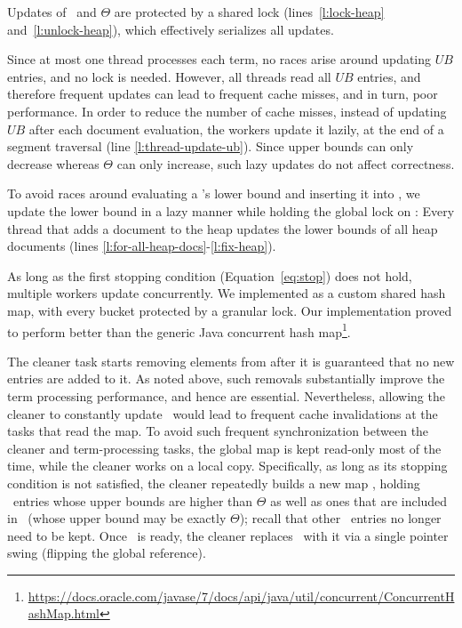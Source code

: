 Updates of \DHeap\ and $\Theta$ are protected by a shared lock (lines~\ref{l:lock-heap} and~\ref{l:unlock-heap}), which effectively serializes all updates. 

Since at most one thread processes each term, no races arise around updating $UB$ entries, and no lock is needed. However, 
all threads read all $UB$ entries, and therefore frequent updates can lead to frequent cache misses, and in turn, poor performance. 
In order to reduce the number of cache misses, instead of updating $UB$ after each document evaluation, the workers update it lazily, at the end of a segment traversal (line \ref{l:thread-update-ub}). Since upper bounds can only decrease whereas $\Theta$ can only increase, such lazy updates do not affect correctness.


To avoid races around evaluating a \Docobj's
lower bound and inserting it into \DHeap, we update the lower bound in a lazy manner while holding the global lock on \DHeap: Every thread that adds a document to the heap updates the lower bounds of all heap documents (lines \ref{l:for-all-heap-docs}-\ref{l:fix-heap}).

As long as the first stopping condition (Equation~\ref{eq:stop}) does not hold, multiple workers update \DMap\/ concurrently. 
We implemented \DMap\/ as a custom shared hash map, with every bucket protected by a granular lock. Our implementation proved to 
perform better than the generic Java concurrent hash map\footnote{\small{\url{https://docs.oracle.com/javase/7/docs/api/java/util/concurrent/ConcurrentHashMap.html}}}.

The cleaner task starts removing elements from  \DMap\/ after it is guaranteed that 
no new entries are added to  it. As noted above, such removals substantially improve the term processing performance,
and hence are essential. 
Nevertheless, allowing the cleaner to constantly update \DMap\ would lead to frequent cache invalidations at the
tasks that read the map. 
To avoid such frequent synchronization between the cleaner and term-processing tasks, 
the global map is kept read-only most of the time, while the cleaner works on a local copy. 
Specifically, as long as its stopping condition is not satisfied, 
the cleaner repeatedly builds a new map \LDMap, holding \DMap\ entries whose upper bounds 
are higher than $\Theta$ as well as ones that are included in \DHeap\ (whose upper bound may be exactly $\Theta$); recall that other \DMap\ entries no longer need to be kept. 
Once \LDMap\ is ready, the cleaner replaces \DMap\ with it via a single pointer swing 
(flipping the global reference). 


